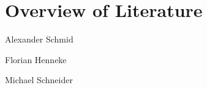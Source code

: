 \documentclass[conference]{IEEEtran}
\begin{document}
\section{Overview of Literature}
Alexander Schmid \cite{Akram2017} \cite{Arm2020} \cite{Asanovic2014} \cite{HeuiLee2001} \cite{Patterson2019} \cite{Perotti2020} \cite{Shore2015} \cite{Waterman2016} \cite{Xu2003}

Florian Henneke \cite{Waterman2016} \cite{Ryzhyk2006} \cite{Asanovic2014} \cite{Furber2000} \cite{Microsoft2020} \cite{Greenwaves2020} \cite{Aws2020} \cite{Microsoft2020}

Michael Schneider \cite{50years} \cite{hennessy2012computer} \cite{drechsler2020enhanced} \cite{WisconsinMadison2016} \cite{IEEE2018} \cite{Dirvin2019} \cite{Bandic2019}



\end{document}
